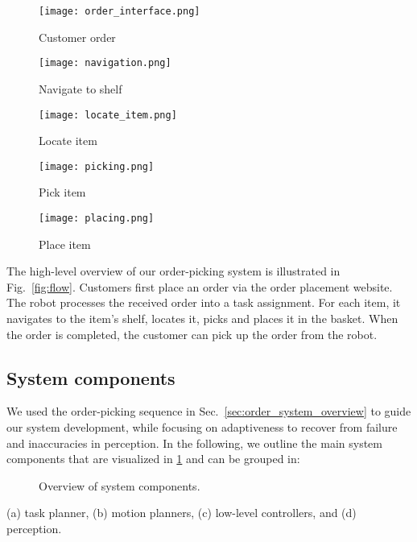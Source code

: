 \begin{figure*}[ht]
  \centering
  \begin{subfigure}[b]{0.18\linewidth}
    \centering
    \texttt{[image: order\_interface.png]}
    \caption{Customer order}
  \end{subfigure}%
  \begin{subfigure}[b]{0.18\linewidth}
    \centering
    \texttt{[image: navigation.png]}
    \caption{Navigate to shelf}
  \end{subfigure}
  \begin{subfigure}[b]{0.18\linewidth}
    \centering
    \texttt{[image: locate\_item.png]}
    \caption{Locate item}
  \end{subfigure}
  \begin{subfigure}[b]{0.18\linewidth}
    \centering
    \texttt{[image: picking.png]}
    \caption{Pick item}
  \end{subfigure}
  \begin{subfigure}[b]{0.18\linewidth}
    \centering
    \texttt{[image: placing.png]}
    \caption{Place item}
  \end{subfigure}
  \caption{Overview of ideal flow of skills to complete an order.}
  \label{fig:flow}
\end{figure*}


%
The high-level overview of our order-picking system is illustrated in Fig.~\ref{fig:flow}.
Customers first place an order via the order placement website. 
The robot processes the received order into a task assignment. 
For each item, it navigates to the item's shelf, locates it, picks and places it in the basket.
When the order is completed, the customer can pick up the order from the robot.





\subsection{System components}

We used the order-picking sequence in Sec.~\ref{sec:order_system_overview} to guide our system development, while focusing on adaptiveness to recover from failure and inaccuracies in perception. 
In the following, we outline the main
system components that are visualized in \cref{fig:software_overview} and can be grouped in: 
\begin{figure}[t]
  \begin{center}
    
  \end{center}
  \caption{Overview of system components.}
  \label{fig:software_overview}
\end{figure}
(a) task planner, (b) motion planners, (c) low-level controllers, and (d) perception.


